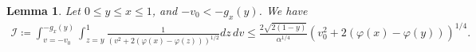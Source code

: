 \documentclass{article}
\newtheorem{lem}{Lemma}[section]
\numberwithin{equation}{section}
\newcommand{\myproof}[1]{
	\noindent \textbf{Demonstration}
	{\small	#1 \hfill \qedsymbol}
}
\begin{document}
\begin{lem}\label{lem:upperbound_ni_beginchar}
	Let $0 \leqslant y \leqslant x \leqslant 1$, and $-v_0 < -g_x(y)$. We have
	\begin{align*}
		\mathcal{I} \coloneqq \int_{v=-v_0}^{-g_x(y)} \int_{z=y}^{1} \frac{1}{\left(v^2 + 2 \left(\varphi(x) - \varphi(z)\right)\right)^{1/2}} dz \, dv \leqslant \frac{2\sqrt{2(1-y)}}{\alpha^{1/4}} \left(v_0^2 + 2 \left(\varphi(x) - \varphi(y)\right)\right)^{1/4}.
	\end{align*}
\end{lem}

\end{document}
